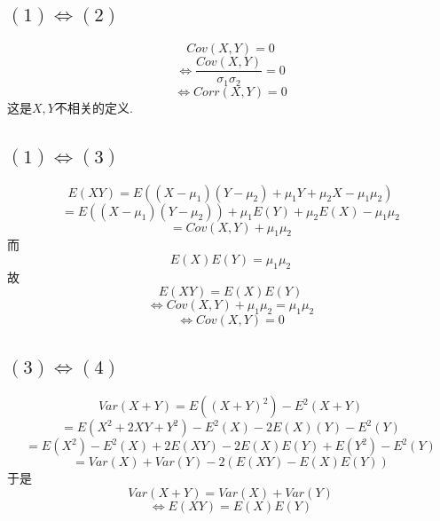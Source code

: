\documentclass{article}
\begin{document}
\begin{CJK}{UTF8}{gbsn}
\subsection{$(1)\Leftrightarrow(2)$}
$$ Cov(X,Y)=0$$
$$ \Leftrightarrow \frac{Cov(X,Y)}{\sigma_{1}\sigma_{2}}=0$$
$$ \Leftrightarrow Corr(X,Y)=0$$
这是$X,Y$不相关的定义.
\subsection{$(1)\Leftrightarrow(3)$}
$$ E(XY)=E((X-\mu_{1})(Y-{\mu_{2}})+\mu_{1}Y+\mu_{2}X-\mu_{1}\mu_{2})$$
$$ =E((X-\mu_{1})(Y-\mu_{2}))+\mu_{1}E(Y)+\mu_{2}E(X)-\mu_{1}\mu_{2}$$
$$ =Cov(X,Y)+\mu_{1}\mu_{2}$$
而
$$ E(X)E(Y)=\mu_{1}\mu_{2}$$
故
$$ E(XY)=E(X)E(Y)$$
$$ \Leftrightarrow Cov(X,Y)+\mu_{1}\mu_{2}=\mu_{1}\mu_{2}$$
$$ \Leftrightarrow Cov(X,Y)=0$$
\subsection{$(3)\Leftrightarrow(4)$}
$$ Var(X+Y)=E((X+Y)^{2})-E^{2}(X+Y)$$
$$ =E(X^{2}+2XY+Y^{2})-E^{2}(X)-2E(X)(Y)-E^{2}(Y)$$
$$ =E(X^{2})-E^{2}(X)+2E(XY)-2E(X)E(Y)+E(Y^{2})-E^{2}(Y)$$
$$ =Var(X)+Var(Y)-2(E(XY)-E(X)E(Y))$$
于是
$$ Var(X+Y)=Var(X)+Var(Y)$$
$$ \Leftrightarrow E(XY)=E(X)E(Y)$$

\end{CJK}
\end{document}
